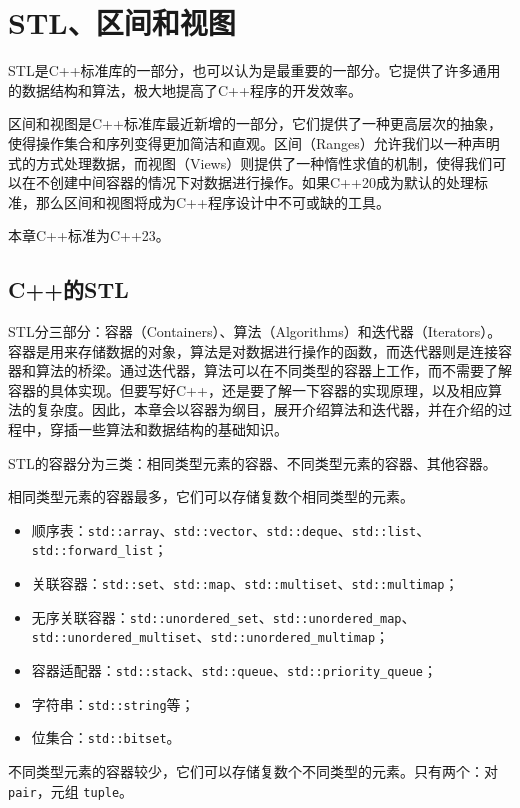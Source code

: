 \chapter{STL、区间和视图}

STL是C++标准库的一部分，也可以认为是最重要的一部分。它提供了许多通用的数据结构和算法，极大地提高了C++程序的开发效率。

区间和视图是C++标准库最近新增的一部分，它们提供了一种更高层次的抽象，使得操作集合和序列变得更加简洁和直观。区间（Ranges）允许我们以一种声明式的方式处理数据，而视图（Views）则提供了一种惰性求值的机制，使得我们可以在不创建中间容器的情况下对数据进行操作。如果C++20成为默认的处理标准，那么区间和视图将成为C++程序设计中不可或缺的工具。

本章C++标准为C++23。

\section{C++的STL}

STL分三部分：容器（Containers）、算法（Algorithms）和迭代器（Iterators）。容器是用来存储数据的对象，算法是对数据进行操作的函数，而迭代器则是连接容器和算法的桥梁。通过迭代器，算法可以在不同类型的容器上工作，而不需要了解容器的具体实现。但要写好C++，还是要了解一下容器的实现原理，以及相应算法的复杂度。因此，本章会以容器为纲目，展开介绍算法和迭代器，并在介绍的过程中，穿插一些算法和数据结构的基础知识。

STL的容器分为三类：相同类型元素的容器、不同类型元素的容器、其他容器。

相同类型元素的容器最多，它们可以存储复数个相同类型的元素。
\begin{itemize}
    \item 顺序表：\verb|std::array|、\verb|std::vector|、\verb|std::deque|、\verb|std::list|、\verb|std::forward_list|；
    \item 关联容器：\verb|std::set|、\verb|std::map|、\verb|std::multiset|、\verb|std::multimap|；
    \item 无序关联容器：\verb|std::unordered_set|、\verb|std::unordered_map|、\verb|std::unordered_multiset|、\verb|std::unordered_multimap|；
    \item 容器适配器：\verb|std::stack|、\verb|std::queue|、\verb|std::priority_queue|；
    \item 字符串：\verb|std::string|等；
    \item 位集合：\verb|std::bitset|。
\end{itemize}

不同类型元素的容器较少，它们可以存储复数个不同类型的元素。只有两个：对 \verb|pair|，元组 \verb|tuple|。

